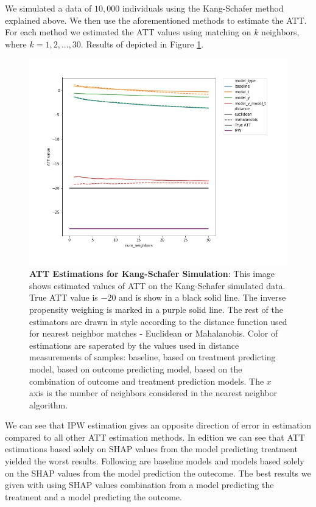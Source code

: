 \documentclass{article}
\begin{document}

We simulated a data of $10,000$ individuals using the Kang-Schafer method explained above. We then use the aforementioned methods to estimate the ATT. For each method we estimated the ATT values using matching on $k$ neighbors, where $k=1,2,...,30$. Results of depicted in Figure \ref{fig:kang_schafer}.

\begin{figure}[H]
    \centering
    \includegraphics[width=\textwidth]{Paper/images/kang_schafer_ATE_estimations_by_neighbor.jpg}
    \caption{\textbf{ATT Estimations for Kang-Schafer Simulation}: This image shows estimated values of ATT on the Kang-Schafer simulated data. True ATT value is $-20$ and is show in a black solid line. The inverse propensity weighing is marked in a purple solid line. The rest of the estimators are drawn in style according to the distance function used for nearest neighbor matches - Euclidean or Mahalanobis. Color of estimations are saperated by the values used in distance measurements of samples: baseline, based on treatment predicting model, based on outcome predicting model, based on the combination of outcome and treatment prediction models. The $x$ axis is the number of neighbors considered in the nearest neighbor algorithm.}
    \label{fig:kang_schafer}
\end{figure}

We can see that IPW estimation gives an opposite direction of error in estimation compared to all other ATT estimation methods. In edition we can see that ATT estimations based solely on SHAP values from the model predicting treatment yielded the worst results. Following are baseline models and models based solely on the SHAP values from the model prediction the outecome. The best results we given with using SHAP values combination from a model predicting the treatment and a model predicting the outcome. 
\end{document}

